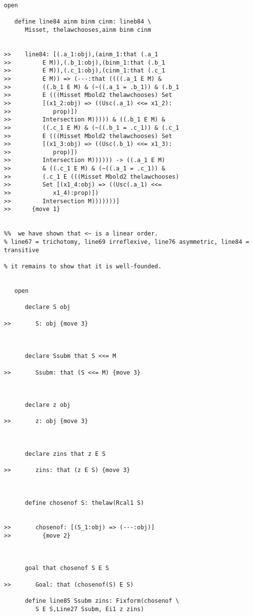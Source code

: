 \documentclass[12pt]{article}
\begin{document}
\begin{verbatim}
open

   define line84 ainm binm cinm: lineb84 \
      Misset, thelawchooses,ainm binm cinm


>>    line84: [(.a_1:obj),(ainm_1:that (.a_1
>>         E M)),(.b_1:obj),(binm_1:that (.b_1
>>         E M)),(.c_1:obj),(cinm_1:that (.c_1
>>         E M)) => (---:that ((((.a_1 E M) &
>>         ((.b_1 E M) & (~((.a_1 = .b_1)) & (.b_1
>>         E (((Misset Mbold2 thelawchooses) Set
>>         [(x1_2:obj) => ((Usc(.a_1) <<= x1_2):
>>            prop)])
>>         Intersection M))))) & ((.b_1 E M) &
>>         ((.c_1 E M) & (~((.b_1 = .c_1)) & (.c_1
>>         E (((Misset Mbold2 thelawchooses) Set
>>         [(x1_3:obj) => ((Usc(.b_1) <<= x1_3):
>>            prop)])
>>         Intersection M)))))) -> ((.a_1 E M)
>>         & ((.c_1 E M) & (~((.a_1 = .c_1)) &
>>         (.c_1 E (((Misset Mbold2 thelawchooses)
>>         Set [(x1_4:obj) => ((Usc(.a_1) <<=
>>            x1_4):prop)])
>>         Intersection M)))))))]
>>      {move 1}


%%  we have shown that <~ is a linear order. 
% line67 = trichotomy, line69 irreflexive, line76 asymmetric, line84 = transitive

% it remains to show that it is well-founded.


   open

      declare S obj

>>       S: obj {move 3}



      declare Ssubm that S <<= M

>>       Ssubm: that (S <<= M) {move 3}



      declare z obj

>>       z: obj {move 3}



      declare zins that z E S

>>       zins: that (z E S) {move 3}



      define chosenof S: thelaw(Rcal1 S)


>>       chosenof: [(S_1:obj) => (---:obj)]
>>         {move 2}



      goal that chosenof S E S

>>       Goal: that (chosenof(S) E S)

      define line85 Ssubm zins: Fixform(chosenof \
         S E S,Line27 Ssubm, Ei1 z zins)


\end{verbatim}
\end{document}
